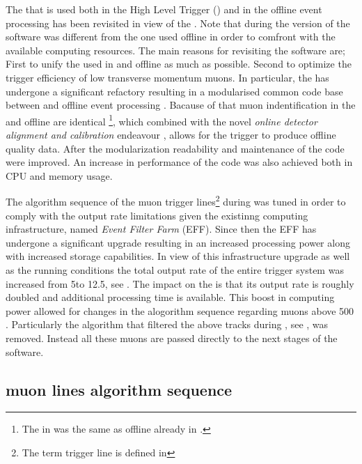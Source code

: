 
The \muonID \cite{LHCb-PUB-2009-013,LHCb-PUB-2010-002} that is used both in the High Level Trigger (\hlt) \cite{LHCb-PUB-2011-017}
and in the offline event processing has been revisited in view of the \lhc \runtwo.
Note that during \runone the \hlt version of the \muonID software was different from the one used offline in order
to comfront with the available computing resources. The main reasons for revisiting the software are;
First to unify the \muonID used in \hlt and offline as much as possible.
Second to optimize the trigger efficiency of low transverse momentum muons.
In particular, the \muonID has undergone a significant refactory resulting in a modularised common code base
between \hlt and offline event processing \cite{kevinThesis}. Bacause of that
muon indentification in the \hltone and offline are identical \footnote{The \muonID in \hlttwo was the same as offline already in \runone.},
which combined with the novel {\it online detector alignment and calibration} endeavour \cite{Aaij:2016rxn,LHCb-PROC-2015-024},  allows for the trigger
to produce offline quality data. After the modularization readability and maintenance of the code were improved.
An increase in performance of the \muonID code was also achieved both in CPU and memory usage.

The algorithm sequence of the \hltone muon trigger lines\footnote{The term trigger line is defined in }
during \runone was tuned in order to comply with the output rate limitations given the existinng computing infrastructure,
named {\it Event Filter Farm} (EFF). Since then the EFF has undergone a significant upgrade resulting in an
increased processing power along with increased storage capabilities. In view of this infrastructure upgrade
as well as the \runtwo \lhc running conditions the total output rate of the entire trigger system was increased
from 5\khz to 12.5\khz, see . The impact on the \hltone is that its output rate is
roughly doubled and additional processing time is available. This boost in computing power allowed for changes
in the \muonID alogorithm sequence regarding muons above 500 \mevc. Particularly the \mvm algorithm that filtered
the above tracks during \runone, see , was removed.
Instead all these muons are passed directly to the next stages of the \muonID software.

\subsection{\hltone muon lines algorithm sequence}
\label{hlt1run2}

